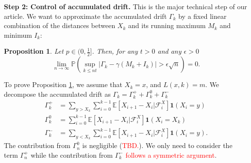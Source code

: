 \documentclass[twoside,12pt,a4paper]{article}
\newtheorem{proposition}{Proposition}[section]
\numberwithin{equation}{section}
\newcommand{\abs}[1]{\left\vert #1 \right\vert}
\newcommand\TBD{\textcolor{red}{TBD.}}
\begin{document}
	\textbf{Step 2: Control of accumulated drift.} This is the major technical step of our article. We want to approximate the accumulated drift $\Gamma_{k}$ by a fixed linear combination of the distances between $X_k$ and its running maximum $M_k$ and minimum $I_k$:
	\begin{proposition}\label{lm: control of acc drift}
		Let $p\in (0,\frac{1}{2}]$. Then, for any $t>0$ and any $\epsilon >0$
		\begin{equation}\label{eq: control of acc drift}
			\lim_{n \to \infty }\mathbb{P}\left(\sup_{k\leq nt} \abs{\Gamma_k - \gamma \left(M_k + I_k \right)   } > \epsilon \sqrt{n}  \right) =0. 
		\end{equation}
	\end{proposition}
	To prove Proposition \ref{lm: control of acc drift}, we assume that $X_k=x $, and $L(x,k)=m$. We decompose the accumulated drift as $\Gamma_k = 	\Gamma_k^+ +	\Gamma_k^0 + \Gamma_k^-$ 
	\begin{align}
		\Gamma_k^+ &= \sum_{y > X_k} \sum_{i = 0}^{k-1} \mathbb{E}\left[ X_{i + 1} - X_i | \mathcal{F}_i^X \right] \mathbf{1}(X_i = y)\\
		\Gamma_k^0 &= \sum_{i = 0}^{k-1} \mathbb{E}\left[ X_{i + 1} - X_i | \mathcal{F}_i^X \right] \mathbf{1}(X_i = X_k) \\
		\Gamma_k^- &= \sum_{y < X_k} \sum_{i = 0}^{k-1} \mathbb{E}\left[ X_{i + 1} - X_i | \mathcal{F}_i^X \right] \mathbf{1}(X_i = y)
		.\end{align} 
	The contribution from $\Gamma_n^0$ is negligible (\TBD). We only need to consider the term $\Gamma_n^+$ while the contribution from $\Gamma_k^-$ \textcolor{red}{follows a symmetric argument}.
	
\end{document}
